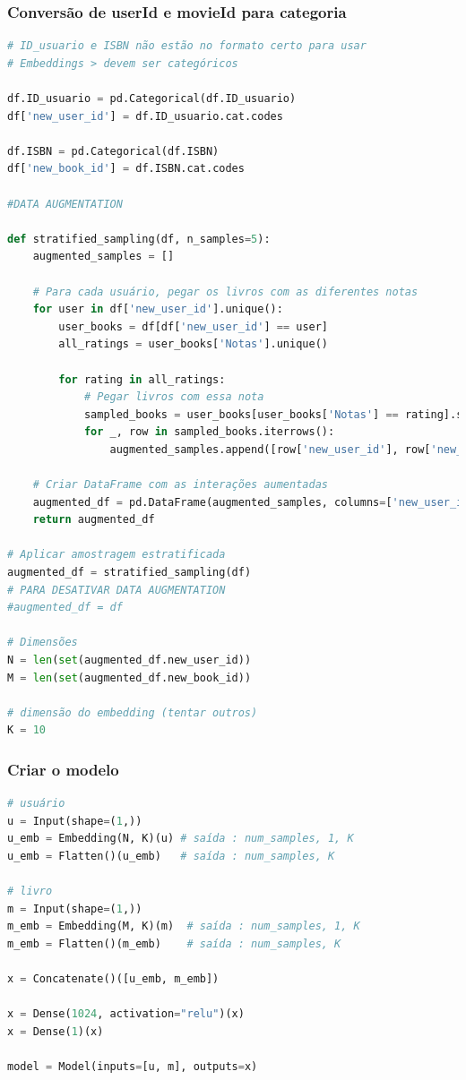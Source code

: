 \subsubsection*{Conversão de userId e movieId para categoria}
\begin{lstlisting}[language=Python, style=input]
# ID_usuario e ISBN não estão no formato certo para usar
# Embeddings > devem ser categóricos

df.ID_usuario = pd.Categorical(df.ID_usuario)
df['new_user_id'] = df.ID_usuario.cat.codes

df.ISBN = pd.Categorical(df.ISBN)
df['new_book_id'] = df.ISBN.cat.codes

#DATA AUGMENTATION

def stratified_sampling(df, n_samples=5):
    augmented_samples = []

    # Para cada usuário, pegar os livros com as diferentes notas
    for user in df['new_user_id'].unique():
        user_books = df[df['new_user_id'] == user]
        all_ratings = user_books['Notas'].unique()

        for rating in all_ratings:
            # Pegar livros com essa nota
            sampled_books = user_books[user_books['Notas'] == rating].sample(n=n_samples, replace=True)
            for _, row in sampled_books.iterrows():
                augmented_samples.append([row['new_user_id'], row['new_book_id'], row['Notas']])

    # Criar DataFrame com as interações aumentadas
    augmented_df = pd.DataFrame(augmented_samples, columns=['new_user_id', 'new_book_id', 'Notas'])
    return augmented_df

# Aplicar amostragem estratificada
augmented_df = stratified_sampling(df)
# PARA DESATIVAR DATA AUGMENTATION
#augmented_df = df

# Dimensões
N = len(set(augmented_df.new_user_id))
M = len(set(augmented_df.new_book_id))

# dimensão do embedding (tentar outros)
K = 10
\end{lstlisting}
\subsubsection*{Criar o modelo}
\begin{lstlisting}[language=Python, style=input]
# usuário
u = Input(shape=(1,))
u_emb = Embedding(N, K)(u) # saída : num_samples, 1, K
u_emb = Flatten()(u_emb)   # saída : num_samples, K

# livro
m = Input(shape=(1,))
m_emb = Embedding(M, K)(m)  # saída : num_samples, 1, K
m_emb = Flatten()(m_emb)    # saída : num_samples, K

x = Concatenate()([u_emb, m_emb])

x = Dense(1024, activation="relu")(x)
x = Dense(1)(x)

model = Model(inputs=[u, m], outputs=x)
\end{lstlisting}
